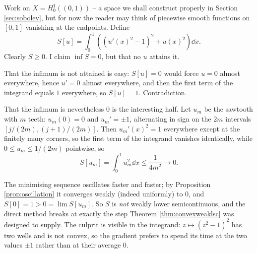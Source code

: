 \documentclass[a4paper]{scrartcl}
\begin{document}
\begin{example}[Bolza]\label{ex:bolza}
	Work on $X = H_0^1((0,1))$ -- a space we shall construct properly in Section \ref{sec:sobolev}, but for now the reader may think of piecewise smooth functions on $[0,1]$ vanishing at the endpoints. Define
	$$S[u]=\int_0^1\left( \left(u'(x)^2-1\right)^2+u(x)^2\right)\dd x.$$
	Clearly $S \ge 0$. I claim $\inf S = 0$, but that no $u$ attains it.

	That the infimum is not attained is easy: $S[u]=0$ would force $u = 0$ almost everywhere, hence $u' = 0$ almost everywhere, and then the first term of the integrand equals $1$ everywhere, so $S[u]=1$. Contradiction.

	That the infimum is nevertheless $0$ is the interesting half. Let $u_m$ be the sawtooth with $m$ teeth: $u_m(0)=0$ and $u_m'=\pm1$, alternating in sign on the $2m$ intervals $[j/(2m),(j+1)/(2m)]$. Then $u_m'(x)^2= 1$ everywhere except at the finitely many corners, so the first term of the integrand vanishes identically, while $0 \le u_m \le 1/(2m)$ pointwise, so
	$$S[u_m]=\int_0^1u_m^2\dd x\le\frac{1}{4m^2}\longrightarrow 0.$$
\begin{center}
\end{center}
	The minimising sequence oscillates faster and faster; by Proposition \ref{prop:oscillation} it converges weakly (indeed uniformly) to $0$, and $S[0]=1 > 0 = \lim S[u_m]$. So $S$ is \emph{not} weakly lower semicontinuous, and the direct method breaks at exactly the step Theorem \ref{thm:convexweaklsc} was designed to supply. The culprit is visible in the integrand: $z \mapsto (z^2-1)^2$ has two wells and is not convex, so the gradient prefers to spend its time at the two values $\pm 1$ rather than at their average $0$.
\end{example}
\end{document}
